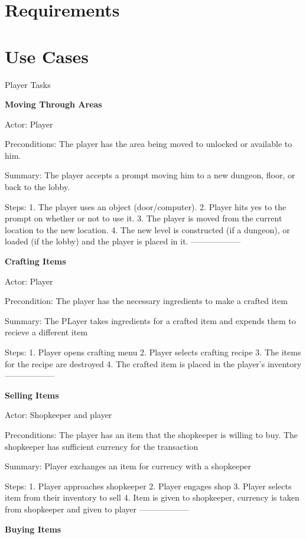 \documentclass[12pt]{report}
\begin{document}
\chapter{Requirements}

\chapter{Use Cases}
\begin {section}{Player Tasks}

\textbf {Moving Through Areas} %

Actor: Player

Preconditions: The player has the area being moved to unlocked or available to him.

Summary: The player accepts a prompt moving him to a new dungeon, floor, or back to the lobby.

Steps:
1. The player uses an object (door/computer).
2. Player hits yes to the prompt on whether or not to use it.
3. The player is moved from the current location to the new location.
4. The new level is constructed (if a dungeon), or loaded (if the lobby) and the player is placed in it.
------------------

\textbf{Crafting Items} %

Actor: Player

Precondition: The player has the necessary ingredients to make a crafted item

Summary: The PLayer takes ingredients for a crafted item and expends them to recieve a different item

Steps:
1. Player opens crafting menu
2. Player selects crafting recipe
3. The items for the recipe are destroyed
4. The crafted item is placed in the player's inventory
------------------

\textbf{Selling Items} %

Actor: Shopkeeper and player

Preconditions: The player has an item that the shopkeeper is willing to buy. The shopkeeper has sufficient
currency for the transaction

Summary: Player exchanges an item for currency with a shopkeeper

Steps: 
1. Player approaches shopkeeper
2. Player engages shop
3. Player selects item from their inventory to sell
4. Item is given to shopkeeper, currency is taken from shopkeeper and given to player
------------------

\textbf{Buying Items} %


\end{section}
\end{document}
